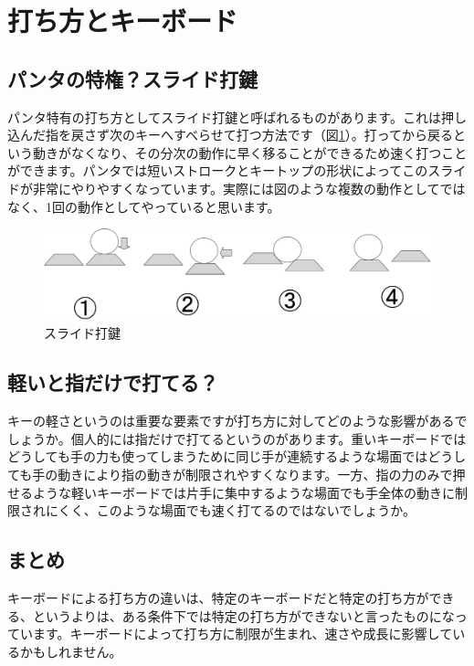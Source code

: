 \section{打ち方とキーボード}

\subsection{パンタの特権？スライド打鍵}
パンタ特有の打ち方としてスライド打鍵と呼ばれるものがあります。これは押し込んだ指を戻さず次のキーへすべらせて打つ方法です（図\ref{eigh:img8}）。打ってから戻るという動きがなくなり、その分次の動作に早く移ることができるため速く打つことができます。パンタでは短いストロークとキートップの形状によってこのスライドが非常にやりやすくなっています。実際には図のような複数の動作としてではなく、1回の動作としてやっていると思います。

\begin{figure}
 \begin{center}
   \includegraphics[width=14cm,clip]{res_eigh/img8.eps}
 \end{center}
 \caption{スライド打鍵}
 \label{eigh:img8}
\end{figure}

\subsection{軽いと指だけで打てる？}
キーの軽さというのは重要な要素ですが打ち方に対してどのような影響があるでしょうか。個人的には指だけで打てるというのがあります。重いキーボードではどうしても手の力も使ってしまうために同じ手が連続するような場面ではどうしても手の動きにより指の動きが制限されやすくなります。一方、指の力のみで押せるような軽いキーボードでは片手に集中するような場面でも手全体の動きに制限されにくく、このような場面でも速く打てるのではないでしょうか。

\subsection{まとめ}
キーボードによる打ち方の違いは、特定のキーボードだと特定の打ち方ができる、というよりは、ある条件下では特定の打ち方ができないと言ったものになっています。キーボードによって打ち方に制限が生まれ、速さや成長に影響しているかもしれません。

